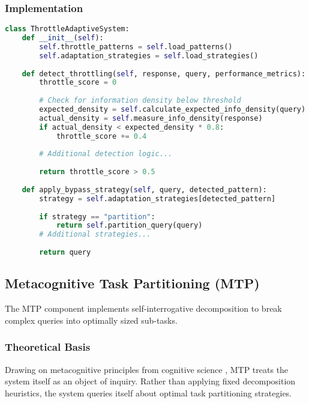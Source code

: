 \documentclass[journal,onecolumn]{IEEEtran}
\begin{document}
\subsubsection{Implementation}

\begin{lstlisting}[language=Python, caption=ATDB Implementation Pseudocode]
class ThrottleAdaptiveSystem:
    def __init__(self):
        self.throttle_patterns = self.load_patterns()
        self.adaptation_strategies = self.load_strategies()
    
    def detect_throttling(self, response, query, performance_metrics):
        throttle_score = 0
        
        # Check for information density below threshold
        expected_density = self.calculate_expected_info_density(query)
        actual_density = self.measure_info_density(response)
        if actual_density < expected_density * 0.8:
            throttle_score += 0.4
        
        # Additional detection logic...
            
        return throttle_score > 0.5
    
    def apply_bypass_strategy(self, query, detected_pattern):
        strategy = self.adaptation_strategies[detected_pattern]
        
        if strategy == "partition":
            return self.partition_query(query)
        # Additional strategies...
            
        return query
\end{lstlisting}

\subsection{Metacognitive Task Partitioning (MTP)}

The MTP component implements self-interrogative decomposition to break complex queries into optimally sized sub-tasks.

\subsubsection{Theoretical Basis}

Drawing on metacognitive principles from cognitive science \cite{flavell1979metacognition}, MTP treats the system itself as an object of inquiry. Rather than applying fixed decomposition heuristics, the system queries itself about optimal task partitioning strategies.
\end{document}
